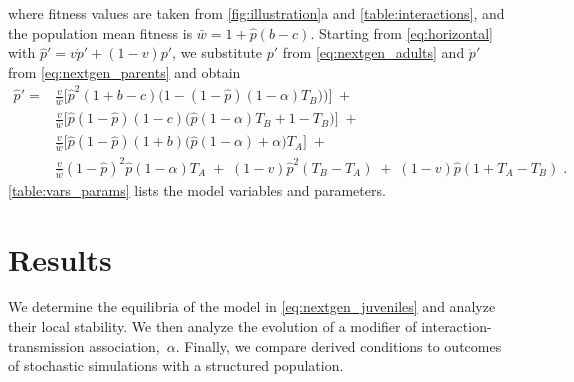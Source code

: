 \documentclass[12pt]{extarticle}
\begin{document}
where fitness values are taken from \autoref{fig:illustration}a and \autoref{table:interactions}, and the population mean fitness is
$\bar{w} =  1 + \hat{p}(b-c)$.
Starting from \autoref{eq:horizontal} with $\hat{p}'=v\dot{p}'+(1-v)p'$, we substitute $p'$ from \autoref{eq:nextgen_adults} and $\dot{p}'$ from \autoref{eq:nextgen_parents} and obtain
\begin{equation} \label{eq:nextgen_juveniles}
\begin{aligned}
\hat{p}' =
& \frac{v}{\bar{w}}\Big[\hat{p}^2(1+b-c)\Big(1-(1-\hat{p})(1-\alpha)T_B)\Big)\Big] \;+ \\
& \frac{v}{\bar{w}}\Big[ \hat{p}(1-\hat{p})(1-c)\big( \hat{p}(1-\alpha)T_B + 1 - T_B \big) \Big] \;+ \\
& \frac{v}{\bar{w}}\Big[ \hat{p}(1-\hat{p})(1+b)\big(\hat{p}(1-\alpha) + \alpha \big) T_A \Big] \;+ \\
& \frac{v}{\bar{w}}(1-\hat{p})^2\hat{p}(1-\alpha)T_A \;+\;
(1-v)\hat{p}^2(T_B-T_A) \;+\;
(1-v)\hat{p}(1+T_A-T_B) \;.
\end{aligned}
\end{equation}
\autoref{table:vars_params} lists the model variables and parameters.


\section*{Results}

We determine the equilibria of the model in \autoref{eq:nextgen_juveniles}
and analyze their local stability.
We then analyze the evolution of a modifier of interaction-transmission association,~$\alpha$.
Finally, we compare derived conditions to outcomes of stochastic simulations with a structured population.
\end{document}
